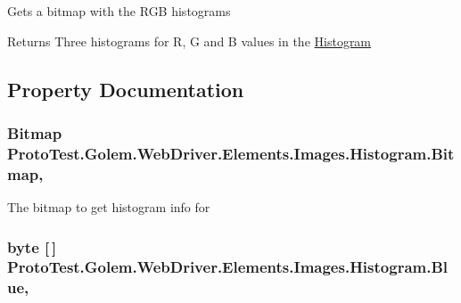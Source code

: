Gets a bitmap with the R\-G\-B histograms 

\begin{DoxyReturn}{Returns}
Three histograms for R, G and B values in the \hyperlink{class_proto_test_1_1_golem_1_1_web_driver_1_1_elements_1_1_images_1_1_histogram}{Histogram}
\end{DoxyReturn}


\subsection{Property Documentation}
\hypertarget{class_proto_test_1_1_golem_1_1_web_driver_1_1_elements_1_1_images_1_1_histogram_af986fdc664c75a0de3285a9ab81cd558}{
\subsubsection[{Bitmap}]{\setlength{\rightskip}{0pt plus 5cm}Bitmap Proto\-Test.\-Golem.\-Web\-Driver.\-Elements.\-Images.\-Histogram.\-Bitmap\hspace{0.3cm}{\ttfamily [get]}, {\ttfamily [set]}}}\label{class_proto_test_1_1_golem_1_1_web_driver_1_1_elements_1_1_images_1_1_histogram_af986fdc664c75a0de3285a9ab81cd558}


The bitmap to get histogram info for 

\hypertarget{class_proto_test_1_1_golem_1_1_web_driver_1_1_elements_1_1_images_1_1_histogram_a3a8e951ec47a138a008416f73d957eae}{
\subsubsection[{Blue}]{\setlength{\rightskip}{0pt plus 5cm}byte \mbox{[}$\,$\mbox{]} Proto\-Test.\-Golem.\-Web\-Driver.\-Elements.\-Images.\-Histogram.\-Blue\hspace{0.3cm}{\ttfamily [get]}, {\ttfamily [set]}}}\label{class_proto_test_1_1_golem_1_1_web_driver_1_1_elements_1_1_images_1_1_histogram_a3a8e951ec47a138a008416f73d957eae}


